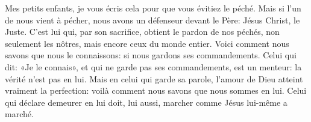 Mes petits enfants, je vous écris cela pour que vous évitiez le péché.
Mais si l’un de nous vient à pécher, nous avons un défenseur devant le Père:
	Jésus Christ, le Juste.
C’est lui qui, par son sacrifice, obtient le pardon de nos péchés,
	non seulement les nôtres, mais encore ceux du monde entier.
Voici comment nous savons que nous le connaissons:
	si nous gardons ses commandements.
Celui qui dit: «Je le connais»,
	et qui ne garde pas ses commandements, est un menteur:
	la vérité n’est pas en lui.
Mais en celui qui garde sa parole,
	l’amour de Dieu atteint vraiment la perfection:
	voilà comment nous savons que nous sommes en lui.
Celui qui déclare demeurer en lui doit, lui aussi, marcher comme Jésus lui-même a marché.
